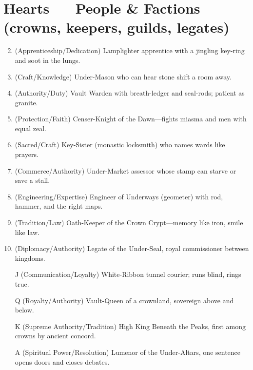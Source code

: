 \section*{Hearts --- People \& Factions (crowns, keepers, guilds, legates)}
\label{sec:aeler-people}
\begin{enumerate}
\setcounter{enumi}{1}
\item (Apprenticeship/Dedication) Lamplighter apprentice with a jingling key-ring and soot in the lungs.
\item (Craft/Knowledge) Under-Mason who can hear stone shift a room away.
\item (Authority/Duty) Vault Warden with breath-ledger and seal-rods; patient as granite.
\item (Protection/Faith) Censer-Knight of the Dawn---fights miasma and men with equal zeal.
\item (Sacred/Craft) Key-Sister (monastic locksmith) who names wards like prayers.
\item (Commerce/Authority) Under-Market assessor whose stamp can starve or save a stall.
\item (Engineering/Expertise) Engineer of Underways (geometer) with rod, hammer, and the right maps.
\item (Tradition/Law) Oath-Keeper of the Crown Crypt---memory like iron, smile like law.
\item (Diplomacy/Authority) Legate of the Under-Seal, royal commissioner between kingdoms.
\item[J] (Communication/Loyalty) White-Ribbon tunnel courier; runs blind, rings true.
\item[Q] (Royalty/Authority) Vault-Queen of a crownland, sovereign above and below.
\item[K] (Supreme Authority/Tradition) High King Beneath the Peaks, first among crowns by ancient concord.
\item[A] (Spiritual Power/Resolution) Lumenor of the Under-Altars, one sentence opens doors and closes debates.
\end{enumerate}

